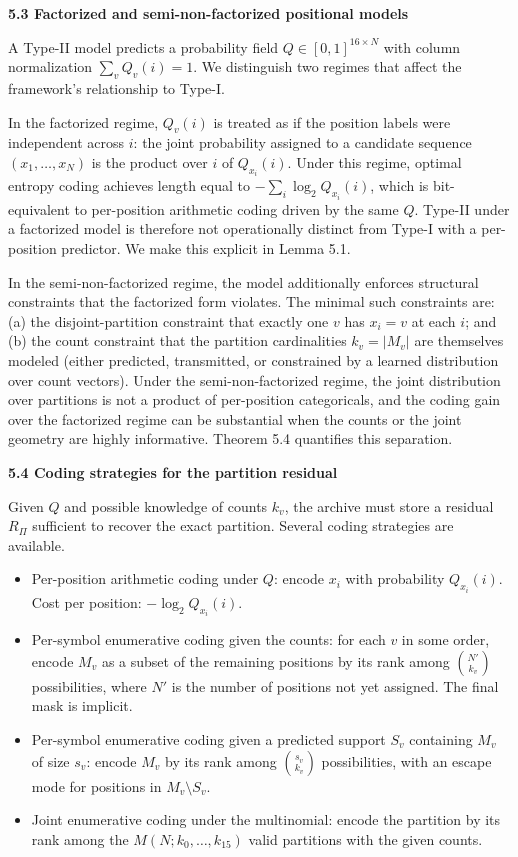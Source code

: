 \documentclass[
]{article}
\begin{document}
\textbf{5.3 Factorized and semi-non-factorized positional models}

A Type-II model predicts a probability field $Q \in [0,1]^{16 \times N}$
with column normalization $\sum_v Q_v(i) = 1$. We distinguish two
regimes that affect the framework's relationship to Type-I.

In the factorized regime, $Q_v(i)$ is treated as if the position labels
were independent across $i$: the joint probability assigned to a
candidate sequence $(x_1, \ldots, x_N)$ is the product over $i$ of
$Q_{x_i}(i)$. Under this regime, optimal entropy coding achieves
length equal to $-\sum_i \log_2 Q_{x_i}(i)$, which is bit-equivalent
to per-position arithmetic coding driven by the same $Q$. Type-II
under a factorized model is therefore not operationally distinct from
Type-I with a per-position predictor. We make this explicit in
Lemma 5.1.

In the semi-non-factorized regime, the model additionally enforces
structural constraints that the factorized form violates. The minimal
such constraints are: (a) the disjoint-partition constraint that
exactly one $v$ has $x_i = v$ at each $i$; and (b) the count
constraint that the partition cardinalities $k_v = |M_v|$ are
themselves modeled (either predicted, transmitted, or constrained by a
learned distribution over count vectors). Under the
semi-non-factorized regime, the joint distribution over partitions is
not a product of per-position categoricals, and the coding gain over
the factorized regime can be substantial when the counts or the joint
geometry are highly informative. Theorem 5.4 quantifies this
separation.

\textbf{5.4 Coding strategies for the partition residual}

Given $Q$ and possible knowledge of counts $k_v$, the archive must
store a residual $R_\Pi$ sufficient to recover the exact partition.
Several coding strategies are available.
\begin{itemize}
\item
  Per-position arithmetic coding under $Q$: encode $x_i$ with
  probability $Q_{x_i}(i)$. Cost per position: $-\log_2 Q_{x_i}(i)$.
\item
  Per-symbol enumerative coding given the counts: for each $v$ in
  some order, encode $M_v$ as a subset of the remaining positions by
  its rank among $\binom{N'}{k_v}$ possibilities, where $N'$ is the
  number of positions not yet assigned. The final mask is implicit.
\item
  Per-symbol enumerative coding given a predicted support $S_v$
  containing $M_v$ of size $s_v$: encode $M_v$ by its rank among
  $\binom{s_v}{k_v}$ possibilities, with an escape mode for positions
  in $M_v \setminus S_v$.
\item
  Joint enumerative coding under the multinomial: encode the partition
  by its rank among the $M(N; k_0, \ldots, k_{15})$ valid partitions
  with the given counts.
\end{itemize}
\end{document}
